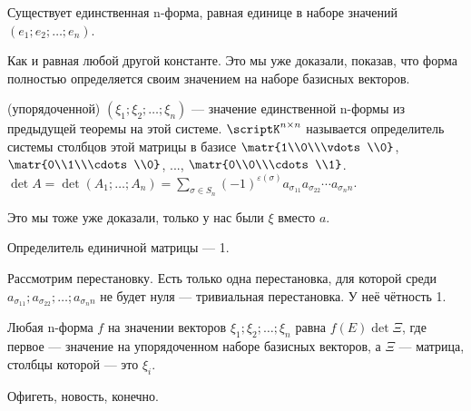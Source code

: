 \documentclass{article}
\begin{document}
\begin{itemize}
        \thm Существует единственная n-форма, равная единице в наборе значений $(e_1;e_2;\ldots;e_n)$.
        \begin{Proof}
            Как и равная любой другой константе. Это мы уже доказали, показав, что форма полностью определяется своим значением на наборе базисных векторов.
        \end{Proof}
        \dfn {} (упорядоченной) $(\xi_1;\xi_2;\ldots;\xi_n)$ --- значение единственной n-формы из предыдущей теоремы на этой системе.
        \dfn {} $\scriptK^{n\times n}$ называется определитель системы столбцов этой матрицы в базисе $\matr{1\\0\\\vdots\\0}$, $\matr{0\\1\\\cdots\\0}$, ..., $\matr{0\\0\\\cdots\\1}$.
        \thm $\det A=\det(A_1;\ldots;A_n)=\sum\limits_{\sigma\in S_n}(-1)^{\varepsilon(\sigma)}a_{\sigma_11}a_{\sigma_22}\cdots a_{\sigma_nn}$.
        \begin{Proof}
            Это мы тоже уже доказали, только у нас были $\xi$ вместо $a$.
        \end{Proof}
        \thm Определитель единичной матрицы --- 1.
        \begin{Proof}
            Рассмотрим перестановку. Есть только одна перестановка, для которой среди $a_{\sigma_11};a_{\sigma_22};\ldots;a_{\sigma_nn}$ не будет нуля --- тривиальная перестановка. У неё чётность 1.
        \end{Proof}
        \thm Любая n-форма $f$ на значении векторов $\xi_1;\xi_2;\ldots;\xi_n$ равна $f(E)\det\Xi$, где первое --- значение на упорядоченном наборе базисных векторов, а $\Xi$ --- матрица, столбцы которой --- это $\xi_i$.
        \begin{Proof}
            Офигеть, новость, конечно.
        \end{Proof}
    \end{itemize}
\end{document}
